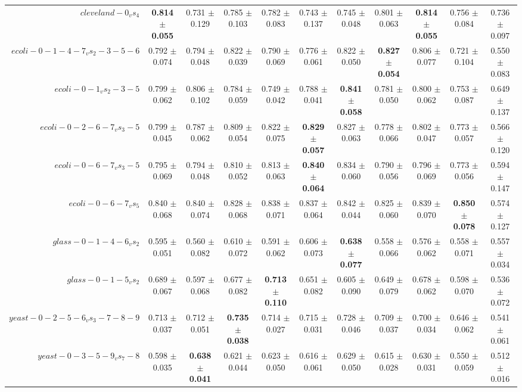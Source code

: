 \begin{table}[!ht]
{\begin{tabular}{r c c c c c c c c c c}
$cleveland-0_vs_4$ & \textbf{0.814 $\pm$ 0.055} & 0.731 $\pm$ 0.129 & 0.785 $\pm$ 0.103 & 0.782 $\pm$ 0.083 & 0.743 $\pm$ 0.137 & 0.745 $\pm$ 0.048 & 0.801 $\pm$ 0.063 & \textbf{0.814 $\pm$ 0.055} & 0.756 $\pm$ 0.084 & 0.736 $\pm$ 0.097 \\
$ecoli-0-1-4-7_vs_2-3-5-6$ & 0.792 $\pm$ 0.074 & 0.794 $\pm$ 0.048 & 0.822 $\pm$ 0.039 & 0.790 $\pm$ 0.069 & 0.776 $\pm$ 0.061 & 0.822 $\pm$ 0.050 & \textbf{0.827 $\pm$ 0.054} & 0.806 $\pm$ 0.077 & 0.721 $\pm$ 0.104 & 0.550 $\pm$ 0.083 \\
$ecoli-0-1_vs_2-3-5$ & 0.799 $\pm$ 0.062 & 0.806 $\pm$ 0.102 & 0.784 $\pm$ 0.059 & 0.749 $\pm$ 0.042 & 0.788 $\pm$ 0.041 & \textbf{0.841 $\pm$ 0.058} & 0.781 $\pm$ 0.050 & 0.800 $\pm$ 0.062 & 0.753 $\pm$ 0.087 & 0.649 $\pm$ 0.137 \\
$ecoli-0-2-6-7_vs_3-5$ & 0.799 $\pm$ 0.045 & 0.787 $\pm$ 0.062 & 0.809 $\pm$ 0.054 & 0.822 $\pm$ 0.075 & \textbf{0.829 $\pm$ 0.057} & 0.827 $\pm$ 0.063 & 0.778 $\pm$ 0.066 & 0.802 $\pm$ 0.047 & 0.773 $\pm$ 0.057 & 0.566 $\pm$ 0.120 \\
$ecoli-0-6-7_vs_3-5$ & 0.795 $\pm$ 0.069 & 0.794 $\pm$ 0.048 & 0.810 $\pm$ 0.052 & 0.813 $\pm$ 0.063 & \textbf{0.840 $\pm$ 0.064} & 0.834 $\pm$ 0.060 & 0.790 $\pm$ 0.056 & 0.796 $\pm$ 0.069 & 0.773 $\pm$ 0.056 & 0.594 $\pm$ 0.147 \\
$ecoli-0-6-7_vs_5$ & 0.840 $\pm$ 0.068 & 0.840 $\pm$ 0.074 & 0.828 $\pm$ 0.068 & 0.838 $\pm$ 0.071 & 0.837 $\pm$ 0.064 & 0.842 $\pm$ 0.044 & 0.825 $\pm$ 0.060 & 0.839 $\pm$ 0.070 & \textbf{0.850 $\pm$ 0.078} & 0.574 $\pm$ 0.127 \\
$glass-0-1-4-6_vs_2$ & 0.595 $\pm$ 0.051 & 0.560 $\pm$ 0.082 & 0.610 $\pm$ 0.072 & 0.591 $\pm$ 0.062 & 0.606 $\pm$ 0.073 & \textbf{0.638 $\pm$ 0.077} & 0.558 $\pm$ 0.066 & 0.576 $\pm$ 0.062 & 0.558 $\pm$ 0.071 & 0.557 $\pm$ 0.034 \\
$glass-0-1-5_vs_2$ & 0.689 $\pm$ 0.067 & 0.597 $\pm$ 0.068 & 0.677 $\pm$ 0.082 & \textbf{0.713 $\pm$ 0.110} & 0.651 $\pm$ 0.082 & 0.605 $\pm$ 0.090 & 0.649 $\pm$ 0.079 & 0.678 $\pm$ 0.062 & 0.598 $\pm$ 0.070 & 0.536 $\pm$ 0.072 \\
$yeast-0-2-5-6_vs_3-7-8-9$ & 0.713 $\pm$ 0.037 & 0.712 $\pm$ 0.051 & \textbf{0.735 $\pm$ 0.038} & 0.714 $\pm$ 0.027 & 0.715 $\pm$ 0.031 & 0.728 $\pm$ 0.046 & 0.709 $\pm$ 0.037 & 0.700 $\pm$ 0.034 & 0.646 $\pm$ 0.062 & 0.541 $\pm$ 0.061 \\
$yeast-0-3-5-9_vs_7-8$ & 0.598 $\pm$ 0.035 & \textbf{0.638 $\pm$ 0.041} & 0.621 $\pm$ 0.044 & 0.623 $\pm$ 0.050 & 0.616 $\pm$ 0.061 & 0.629 $\pm$ 0.050 & 0.615 $\pm$ 0.028 & 0.630 $\pm$ 0.031 & 0.550 $\pm$ 0.059 & 0.512 $\pm$ 0.016 \\

\end{tabular}}
\end{table}
